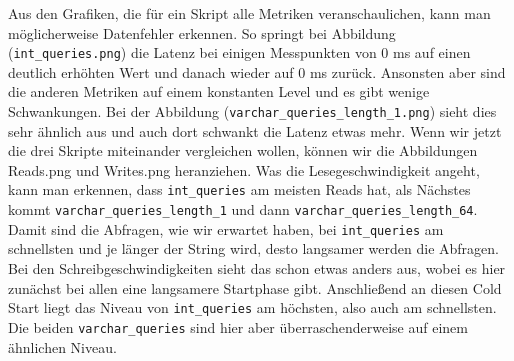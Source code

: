 Aus den Grafiken, die für ein Skript alle Metriken veranschaulichen, kann man möglicherweise Datenfehler erkennen.
So springt bei Abbildung (\texttt{int\_queries.png}) die Latenz bei einigen Messpunkten von 0 ms auf einen deutlich erhöhten Wert und danach wieder auf 0 ms zurück.
Ansonsten aber sind die anderen Metriken auf einem konstanten Level und es gibt wenige Schwankungen.
Bei der Abbildung (\texttt{varchar\_queries\_length\_1.png}) sieht dies sehr ähnlich aus und auch dort schwankt die Latenz etwas mehr.
Wenn wir jetzt die drei Skripte miteinander vergleichen wollen, können wir die Abbildungen Reads.png und Writes.png heranziehen.
Was die Lesegeschwindigkeit angeht, kann man erkennen, dass \texttt{int\_queries} am meisten Reads hat, als Nächstes kommt \texttt{varchar\_queries\_length\_1} und dann \texttt{varchar\_queries\_length\_64}.
Damit sind die Abfragen, wie wir erwartet haben, bei \texttt{int\_queries} am schnellsten und je länger der String wird, desto langsamer werden die Abfragen.
Bei den Schreibgeschwindigkeiten sieht das schon etwas anders aus, wobei es hier zunächst bei allen eine langsamere Startphase gibt.
Anschließend an diesen Cold Start liegt das Niveau von \texttt{int\_queries} am höchsten, also auch am schnellsten.
Die beiden \texttt{varchar\_queries} sind hier aber überraschenderweise auf einem ähnlichen Niveau.

